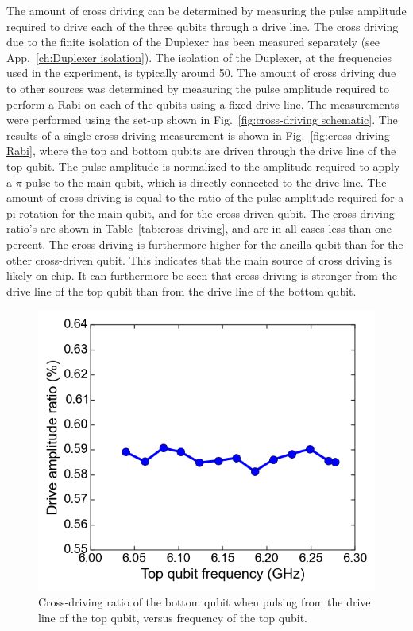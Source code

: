       The amount of cross driving can be determined by measuring the pulse amplitude required to drive each of the three qubits through a drive line. The cross driving due to the finite isolation of the Duplexer has been measured separately (see App.~\ref{ch:Duplexer isolation}). The isolation of the Duplexer, at the frequencies used in the experiment, is typically around \SI{50}{\dBm}. The amount of cross driving due to other sources was determined by measuring the pulse amplitude required to perform a Rabi on each of the qubits using a fixed drive line. The measurements were performed using the set-up shown in Fig.~\ref{fig:cross-driving schematic}. The results of a single cross-driving measurement is shown in Fig.~\ref{fig:cross-driving Rabi}, where the top and bottom qubits are driven through the drive line of the top qubit. The pulse amplitude is normalized to the amplitude required to apply a $\pi$ pulse to the main qubit, which is directly connected to the drive line. The amount of cross-driving is equal to the ratio of the pulse amplitude required for a pi rotation for the main qubit, and for the cross-driven qubit. The cross-driving ratio's are shown in Table~\ref{tab:cross-driving}, and are in all cases less than one percent. The cross driving is furthermore higher for the ancilla qubit than for the other cross-driven qubit. This indicates that the main source of cross driving is likely on-chip. It can furthermore be seen that cross driving is stronger from the drive line of the top qubit than from the drive line of the bottom qubit.

      \begin{figure}
        \begin{center}
        \vspace{-30pt}
          \includegraphics[width=\textwidth]{Figures/Exploring frequency reuse/cross-driving_vs_top_frequency.png}
        \end{center}
        \vspace{-20 pt}
        \caption{Cross-driving ratio of the bottom qubit when pulsing from the drive line of the top qubit, versus frequency of the top qubit. }
        \label{fig:cross-driving versus top frequency}
      \end{figure}

